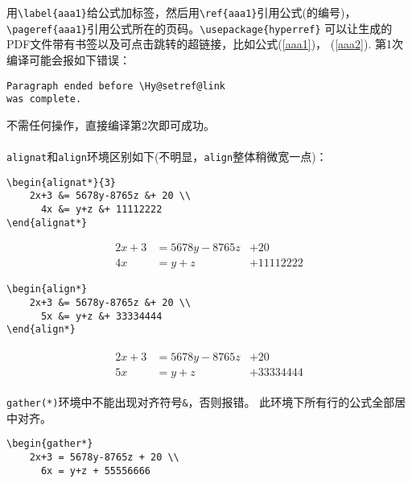 \documentclass{article}
\begin{document}
\begin{multicols}{2}
\begin{enumerate}
用\verb|\label{aaa1}|给公式加标签，然后用\verb|\ref{aaa1}|引用公式(的编号)，
\verb|\pageref{aaa1}|引用公式所在的页码。\verb|\usepackage{hyperref}|
可以让生成的PDF文件带有书签以及可点击跳转的超链接，比如公式(\ref{aaa1})，
(\ref{aaa2}). 第1次编译可能会报如下错误：
\begin{lstlisting}
Paragraph ended before \Hy@setref@link 
was complete.
\end{lstlisting} 
不需任何操作，直接编译第2次即可成功。\\
\\
\verb|alignat|和\verb|align|环境区别如下(不明显，\verb|align|整体稍微宽一点)：
\begin{lstlisting}
\begin{alignat*}{3}
    2x+3 &= 5678y-8765z &+ 20 \\
      4x &= y+z &+ 11112222 
\end{alignat*}    
\end{lstlisting} 
\begin{tcolorbox}
    \vspace{-5mm}
\begin{alignat*}{3}   
    2x+3 &= 5678y-8765z &+ 20 \\
    4x &= y+z &+ 11112222  
\end{alignat*} 
\end{tcolorbox}
\begin{lstlisting}
\begin{align*}
    2x+3 &= 5678y-8765z &+ 20 \\
      5x &= y+z &+ 33334444 
\end{align*}    
\end{lstlisting} 
\begin{tcolorbox}
    \vspace{-3mm}
\begin{align*}
    \begin{aligned}
      2x+3 &= 5678y-8765z &+ 20 \\
        5x &= y+z &+ 33334444 
    \end{aligned} 
\end{align*}
\end{tcolorbox}
\verb|gather(*)|环境中不能出现对齐符号\verb|&|，否则报错。
此环境下所有行的公式全部居中对齐。
\begin{lstlisting}
\begin{gather*}
    2x+3 = 5678y-8765z + 20 \\
      6x = y+z + 55556666 

\end{lstlisting}
\end{enumerate}
\end{multicols}
\end{document}
